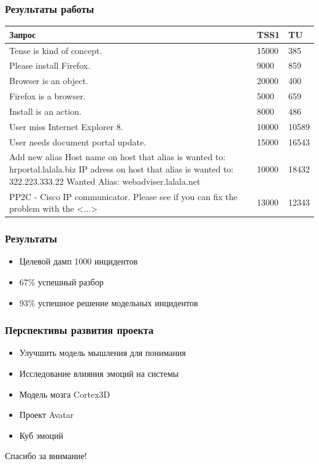 \documentclass[14pt]{beamer}
\begin{document}
\begin{frame}
\frametitle{Результаты работы}
\begin{table}
	
\small
\begin{tabular} {|p{8cm}|p{1cm}|p{1cm}|}

\hline
\textbf{Запрос} & TSS1 & TU \\
\hline
  Tense is kind of concept. & 15000 & 385 \\
  
  \hline
  Please install Firefox.  & 9000 & 859 \\
  \hline
  Browser is an object.   & 20000 & 400 \\
  \hline
  Firefox is a browser.   & 5000 & 659  \\
  \hline
  Install is an action.    & 8000 & 486 \\
  \hline
  User miss Internet Explorer 8.     & 10000 & 10589 \\
  \hline
  User needs document portal update.    & 15000 & 16543 \\
  \hline
  Add new alias Host name on host that alias is wanted to: hrportal.lalala.biz IP adress on host that alias is wanted to: 322.223.333.22 Wanted Alias:    webadviser.lalala.net    & 10000 & 18432  \\ 
  \hline
  PP2C - Cisco IP communicator. Please see if you can fix the problem with the <...> & 13000 & 12343 \\ 
   \hline
   \end{tabular}
\end{table}
\end{frame}

\begin{frame}
\frametitle{Результаты}
\begin{itemize}
	\item Целевой дамп 1000 инцидентов
	\item 67\% успешный разбор
	\item 93\% успешное решение модельных инцидентов
\end{itemize}
\end{frame}

\begin{frame}
\frametitle{Перспективы развития проекта}
\begin{itemize}
  \item Улучшить модель мышления для понимания
  \item Исследование влияния эмоций на системы
  \item Модель мозга Cortex3D
  \item Проект Avatar
  \item Куб эмоций
\end{itemize}
\end{frame}


\begin{frame}
\begin{center}
Спасибо за внимание!
\end{center}
\end{frame}
\end{document}
